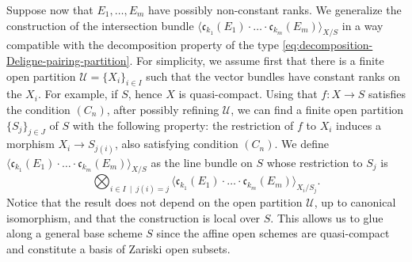\documentclass[JEP,XML,SOM,Unicode,published]{cedram}
\theoremstyle{plain}
\theoremstyle{definition}
\newcommand{\Ucal}{\mathcal U}
\newcommand{\cfrak}{\mathfrak c}
\begin{document}
Suppose now that $E_{1},\ldots, E_{m}$ have possibly non-constant ranks. We generalize the construction of the intersection bundle $\langle \cfrak_{k_{1}}(E_{1})\cdot\ldots \cdot \cfrak_{k_{m}}(E_{m})\rangle_{X/S}$ in a way compatible with the decomposition property of the type \eqref{eq:decomposition-Deligne-pairing-partition}. For simplicity, we assume first that there is a finite open partition $\Ucal=\lbrace X_{i}\rbrace_{i\in I}$ such that the vector bundles have constant ranks on the $X_{i}$. For example, if $S$, hence $X$ is quasi-compact. Using that $f\colon X\to S$ satisfies the condition $(C_{n})$, after possibly refining $\Ucal$, we can find a finite open partition $\lbrace S_{j}\rbrace_{j\in J}$ of $S$ with the following property: the restriction of $f$ to $X_{i}$ induces a morphism $X_{i}\to S_{j(i)}$, also satisfying condition $(C_{n})$. We define $\langle \cfrak_{k_{1}}(E_{1})\cdot\ldots \cdot \cfrak_{k_{m}}(E_{m})\rangle_{X/S}$ as the line bundle on $S$ whose restriction to $S_{j}$ is\vspace*{-3pt}
\begin{equation}\label{eq:def-intersection-bundle-open-partitions}
\bigotimes_{i\in I\ \mid\ j(i)=j}\langle \cfrak_{k_{1}}(E_{1})\cdot\ldots \cdot \cfrak_{k_{m}}(E_{m})\rangle_{X_{i}/S_{j}}.
\end{equation}
Notice that the result does not depend on the open partition $\Ucal$, up to canonical isomorphism, and that the construction is local over $S$. This allows us to glue along a general base scheme $S$ since the affine open schemes are quasi-compact and constitute a basis of Zariski open subsets.
\end{document}
